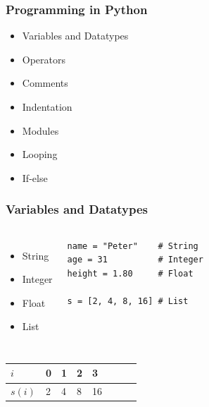 \documentclass{beamer}
\begin{document}
\begin{frame}[fragile]

    \frametitle{Programming in Python}

    \begin{itemize}
        \item Variables and Datatypes
        \item Operators
        \item Comments
        \item Indentation
        \item Modules
        \item Looping
        \item If-else
    \end{itemize}

\end{frame}


\begin{frame}[fragile]

    \frametitle{Variables and Datatypes}

    \begin{columns}[t]


            \begin{itemize}
                \item String
                \item Integer
                \item Float
                \item List
            \end{itemize}


\begin{lstlisting}
name = "Peter"    # String
age = 31          # Integer
height = 1.80     # Float

s = [2, 4, 8, 16] # List
\end{lstlisting}

    \end{columns}

    \bigskip

    \centering

\begin{tabular}{llllllll}
   $i$  & 0  & 1 & 2 & 3 \\ \hline
$s(i)$ & 2 & 4 & 8 & 16  
\end{tabular}



\end{frame}
\end{document}
